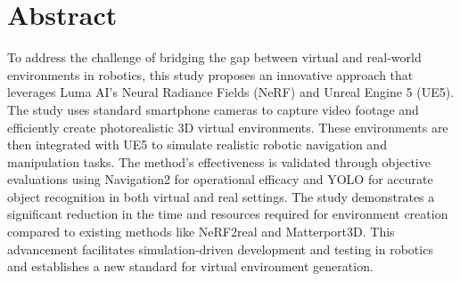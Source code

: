 \chapter*{Abstract}
To address the challenge of bridging the gap between virtual and real-world environments in robotics, this study proposes an innovative approach that leverages Luma AI's Neural Radiance Fields (NeRF) and Unreal Engine 5 (UE5). The study uses standard smartphone cameras to capture video footage and efficiently create photorealistic 3D virtual environments. These environments are then integrated with UE5 to simulate realistic robotic navigation and manipulation tasks. The method's effectiveness is validated through objective evaluations using Navigation2 for operational efficacy and YOLO for accurate object recognition in both virtual and real settings. The study demonstrates a significant reduction in the time and resources required for environment creation compared to existing methods like NeRF2real and Matterport3D. This advancement facilitates simulation-driven development and testing in robotics and establishes a new standard for virtual environment generation. 
\thispagestyle{empty}
